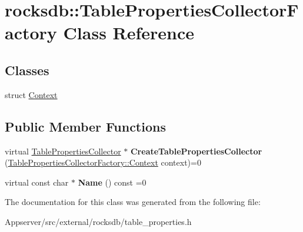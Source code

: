 \hypertarget{classrocksdb_1_1TablePropertiesCollectorFactory}{}\section{rocksdb\+:\+:Table\+Properties\+Collector\+Factory Class Reference}
\label{classrocksdb_1_1TablePropertiesCollectorFactory}
\subsection*{Classes}
\begin{DoxyCompactItemize}
\item 
struct \hyperlink{structrocksdb_1_1TablePropertiesCollectorFactory_1_1Context}{Context}
\end{DoxyCompactItemize}
\subsection*{Public Member Functions}
\begin{DoxyCompactItemize}
\item 
virtual \hyperlink{classrocksdb_1_1TablePropertiesCollector}{Table\+Properties\+Collector} $\ast$ {\bfseries Create\+Table\+Properties\+Collector} (\hyperlink{structrocksdb_1_1TablePropertiesCollectorFactory_1_1Context}{Table\+Properties\+Collector\+Factory\+::\+Context} context)=0\hypertarget{classrocksdb_1_1TablePropertiesCollectorFactory_a38217a541c31dcdd92188c10c544481c}{}\label{classrocksdb_1_1TablePropertiesCollectorFactory_a38217a541c31dcdd92188c10c544481c}

\item 
virtual const char $\ast$ {\bfseries Name} () const =0\hypertarget{classrocksdb_1_1TablePropertiesCollectorFactory_ac01de4e3240cbae8b5f0027f4a328adc}{}\label{classrocksdb_1_1TablePropertiesCollectorFactory_ac01de4e3240cbae8b5f0027f4a328adc}

\end{DoxyCompactItemize}


The documentation for this class was generated from the following file\+:\begin{DoxyCompactItemize}
\item 
Appserver/src/external/rocksdb/table\+\_\+properties.\+h\end{DoxyCompactItemize}
